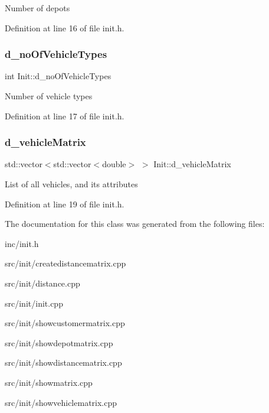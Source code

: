 Number of depots 

Definition at line 16 of file init.\+h.

\mbox{\label{class_init_a636841b2dccedbe95e966d59452c4585}} 
\subsubsection{\texorpdfstring{d\+\_\+no\+Of\+Vehicle\+Types}{d\_noOfVehicleTypes}}
{\footnotesize\ttfamily int Init\+::d\+\_\+no\+Of\+Vehicle\+Types\hspace{0.3cm}{\ttfamily [private]}}

Number of vehicle types 

Definition at line 17 of file init.\+h.

\mbox{\label{class_init_a3d56c67f9c6ba79f0fc2252bbc964345}} 
\subsubsection{\texorpdfstring{d\+\_\+vehicle\+Matrix}{d\_vehicleMatrix}}
{\footnotesize\ttfamily std\+::vector$<$std\+::vector$<$double$>$ $>$ Init\+::d\+\_\+vehicle\+Matrix\hspace{0.3cm}{\ttfamily [private]}}

List of all vehicles, and its attributes 

Definition at line 19 of file init.\+h.



The documentation for this class was generated from the following files\+:\begin{DoxyCompactItemize}
\item 
inc/init.\+h\item 
src/init/createdistancematrix.\+cpp\item 
src/init/distance.\+cpp\item 
src/init/init.\+cpp\item 
src/init/showcustomermatrix.\+cpp\item 
src/init/showdepotmatrix.\+cpp\item 
src/init/showdistancematrix.\+cpp\item 
src/init/showmatrix.\+cpp\item 
src/init/showvehiclematrix.\+cpp\end{DoxyCompactItemize}
